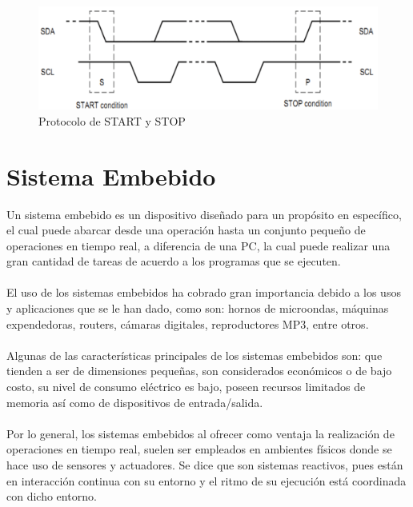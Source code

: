 \begin{figure}[H]
	\centering
	\includegraphics[scale=.25]{Capitulo2/images/startstop.png}
	\caption{Protocolo de START y STOP}
	\label{fig:}
\end{figure}



\section{Sistema Embebido}
Un sistema embebido es un dispositivo diseñado para un propósito en específico, el cual puede abarcar desde una operación hasta un conjunto pequeño de operaciones en tiempo real, a diferencia de una PC, la cual puede realizar una gran cantidad de tareas de acuerdo a los programas que se ejecuten. 
\paragraph{}
El uso de los sistemas embebidos ha cobrado gran importancia debido a los usos y aplicaciones que se le han dado, como son: hornos de microondas, máquinas expendedoras, routers, cámaras digitales, reproductores MP3, entre otros. 
\paragraph{}
Algunas de las características principales de los sistemas embebidos son: que tienden a ser de dimensiones pequeñas, son considerados económicos o de bajo costo, su nivel de consumo eléctrico es bajo, poseen recursos limitados de memoria así como de dispositivos de entrada/salida.\citep{MarcoTeorico14}
\paragraph{}
Por lo general, los sistemas embebidos al ofrecer como ventaja la realización de operaciones en tiempo real, suelen ser empleados en ambientes físicos donde se hace uso de sensores y actuadores. Se dice que son sistemas reactivos, pues están en interacción continua con su entorno y el ritmo de su ejecución está coordinada con dicho entorno. 

